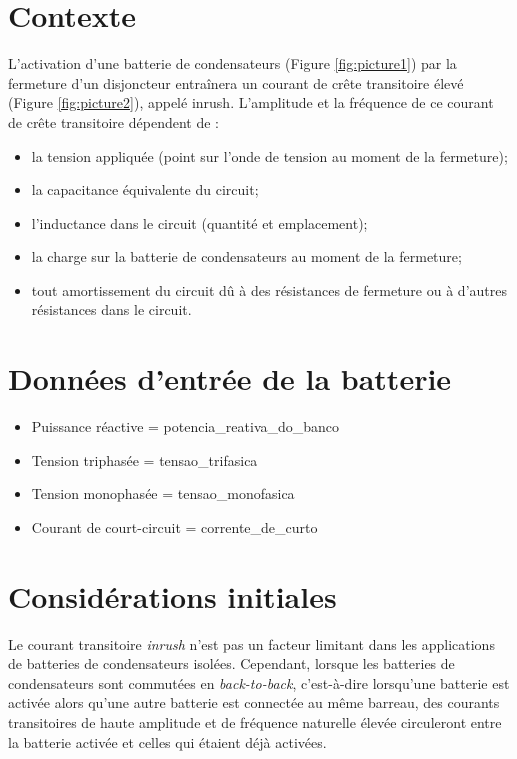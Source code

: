 \documentclass[a4paper]{article}
\begin{document}
	
	\section{Contexte}
	L'activation d'une batterie de condensateurs (Figure \ref{fig:picture1}) par la fermeture d'un disjoncteur entraînera un courant de crête transitoire élevé (Figure \ref{fig:picture2}), appelé inrush. L'amplitude et la fréquence de ce courant de crête transitoire dépendent de :
	\begin{itemize}[label=\textendash]
		\item la tension appliquée (point sur l'onde de tension au moment de la fermeture);
		\item la capacitance équivalente du circuit;
		\item l'inductance dans le circuit (quantité et emplacement);
		\item la charge sur la batterie de condensateurs au moment de la fermeture;
		\item tout amortissement du circuit dû à des résistances de fermeture ou à d'autres résistances dans le circuit.
	\end{itemize}
	
	\section{Données d'entrée de la batterie}
	\begin{itemize}[label=\textendash]
		\item Puissance réactive  = {{potencia_reativa_do_banco}}
		\item Tension triphasée  = {{tensao_trifasica}}
		\item Tension monophasée  = {{tensao_monofasica}}
		\item Courant de court-circuit  = {{corrente_de_curto}}
	\end{itemize}
	
	\begin{center}
	\end{center}
	
	\section{Considérations initiales}
	
	Le courant transitoire \textit{inrush} n'est pas un facteur limitant dans les applications de batteries de condensateurs isolées. Cependant, lorsque les batteries de condensateurs sont commutées en \textit{back-to-back}, c'est-à-dire lorsqu'une batterie est activée alors qu'une autre batterie est connectée au même barreau, des courants transitoires de haute amplitude et de fréquence naturelle élevée circuleront entre la batterie activée et celles qui étaient déjà activées.
	
\end{document}

